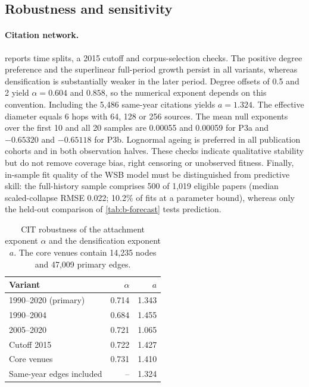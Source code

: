 \subsection{Robustness and sensitivity}\label{sec:r-robustness}
\paragraph{Citation network.}
 reports time splits, a 2015 cutoff and corpus-selection checks. The
positive degree preference and the superlinear full-period growth persist in all variants,
whereas densification is substantially weaker in the later period. Degree offsets of 0.5 and
2 yield $\alpha=0.604$ and $0.858$, so the numerical exponent depends on this convention.
Including the 5,486 same-year citations yields $a=1.324$. The effective diameter equals 6
hops with 64, 128 or 256 sources. The mean null exponents over the first 10 and all 20
samples are 0.00055 and 0.00059 for P3a and $-0.65320$ and $-0.65118$ for P3b. Lognormal
ageing is preferred in all publication cohorts and in both observation halves. These checks
indicate qualitative stability but do not remove coverage bias, right censoring or
unobserved fitness. Finally, in-sample fit quality of the WSB model must be distinguished
from predictive skill: the full-history sample comprises 500 of 1,019 eligible papers
(median scaled-collapse RMSE 0.022; 10.2\% of fits at a parameter bound), whereas only the
held-out comparison of \cref{tab:b-forecast} tests prediction.

\begin{table}[t]
\centering\small
\setlength{\tabcolsep}{4pt}
\begin{tabular*}{\columnwidth}{@{\extracolsep{\fill}}lrr@{}}
\toprule Variant & $\alpha$ & $a$\\
\midrule
1990--2020 (primary) & 0.714 & 1.343\\
1990--2004 & 0.684 & 1.455\\
2005--2020 & 0.721 & 1.065\\
Cutoff 2015 & 0.722 & 1.427\\
Core venues & 0.731 & 1.410\\
Same-year edges included & -- & 1.324\\
\bottomrule
\end{tabular*}
\caption{CIT robustness of the attachment exponent $\alpha$ and the densification exponent
$a$. The core venues contain 14,235 nodes and 47,009 primary edges.}
\label{tab:b-robustness}
\end{table}

